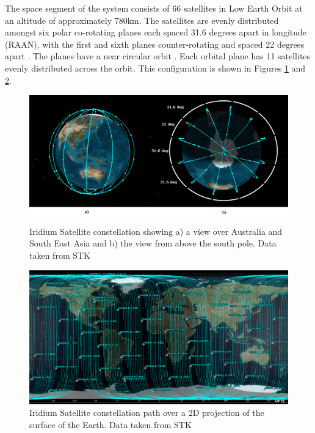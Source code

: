 The space segment of the system consists of 66 satellites in Low Earth Orbit at an altitude of approximately 780km. The satellites are evenly distributed amongst six polar co-rotating planes each spaced 31.6 degrees apart in longitude (RAAN), with the first and sixth planes counter-rotating and spaced 22 degrees apart \cite{iridium_ICAO_man, iridium:an_overview1998}. The planes have a near circular orbit \cite{Pratt1999}. Each orbital plane has 11 satellites evenly distributed across the orbit. This configuration is shown in Figures \ref{fig:iridium_stk} and \ref{fig:iridium_2d_stk}.
\begin{figure}[H]
	\centering
	\includegraphics[scale = 0.45]{Pictures/iridium_stk.png}
	
	\caption{Iridium Satellite constellation showing a) a view over Australia and South East Asia and b) the view from above the south pole. Data taken from STK}
	\label{fig:iridium_stk}
\end{figure}
\begin{figure}[H]
	\centering
	\includegraphics[scale = 0.35]{Pictures/iridium_2d_stk.png}
	
	\caption{Iridium Satellite constellation path over a 2D projection of the surface of the Earth. Data taken from STK}
	\label{fig:iridium_2d_stk}
\end{figure}

